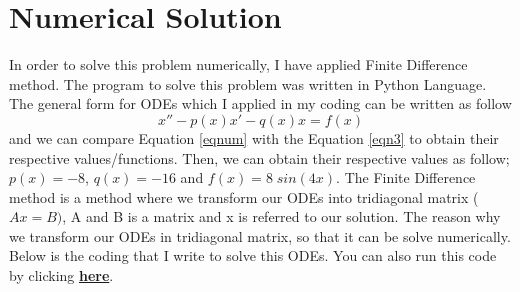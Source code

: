 \documentclass[a4paper,11.5 pt]{article}
\begin{document}
\section{Numerical Solution}
In order to solve this problem numerically, I have applied Finite Difference method. The program to solve this problem was written in Python Language. The general form for ODEs which I applied in my coding can be written as follow 
\begin{equation}\label{eqnum}
    x''-p(x)x'-q(x)x = f(x)
\end{equation}
and we can compare Equation \ref{eqnum} with the Equation \ref{eqn3} to obtain their respective values/functions. Then, we can obtain their respective values as follow; $p(x) = -8$, $q(x) = -16$ and $f(x) = 8\;sin(4x)$. The Finite Difference method is a method where we transform our ODEs into tridiagonal matrix ($Ax = B)$, A and B is a matrix and x is referred to our solution. The reason why we transform our ODEs in tridiagonal matrix, so that it can be solve numerically. Below is the coding that I write to solve this ODEs. You can also run this code by clicking  \href{https://colab.research.google.com/drive/1UfvaS4Z1WwThruj0EPfhFcVaZ2bx0lt2?usp=sharing}{\textbf{here}}.
\end{document}
